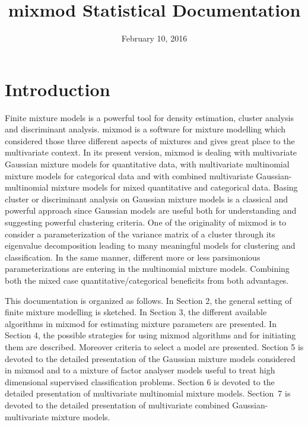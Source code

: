 \documentclass[12pt]{article}
\title{{\sc mixmod} Statistical Documentation}
\date{February 10, 2016}
\begin{document}
\maketitle
\tableofcontents
\newpage
\section{Introduction}
Finite mixture models is a powerful tool for density estimation, cluster analysis and
discriminant analysis. {\sc mixmod} is a software for {\sc mix}ture {\sc mod}elling which
considered those three different aspects of mixtures and gives great place to the multivariate
context. In its present version, {\sc mixmod} is dealing with multivariate Gaussian mixture
models for quantitative data, with multivariate multinomial mixture models for categorical data and with combined multivariate Gaussian-multinomial mixture models for mixed quantitative and categorical data.
Basing cluster or discriminant analysis on Gaussian mixture models is a classical and powerful
approach since Gaussian models are useful both for understanding and suggesting powerful
clustering criteria. One of the originality of {\sc mixmod} is to consider a parameterization
of the variance matrix of a cluster through its eigenvalue decomposition leading to many
meaningful models for clustering and classification.  In the same manner, different more or
less parsimonious parameterizations are entering in the multinomial mixture models. Combining both the mixed case quantitative/categorical beneficits from both advantages.

This documentation is organized as follows. In Section 2, the general setting of finite mixture
modelling is sketched. In Section 3, the different available algorithms in {\sc mixmod} for
estimating mixture parameters are presented. In Section 4, the possible strategies for using
{\sc mixmod} algorithms and for initiating them are described. Moreover criteria to select a
model are presented. Section 5 is devoted to the detailed presentation of the Gaussian mixture
models considered in {\sc mixmod} and to a mixture of factor analyser models useful to treat
high dimensional supervised classification problems. Section 6 is devoted to the detailed
presentation of multivariate multinomial mixture models. Section~7  is devoted to the detailed presentation of multivariate combined Gaussian-multivariate mixture models.


\end{document}
